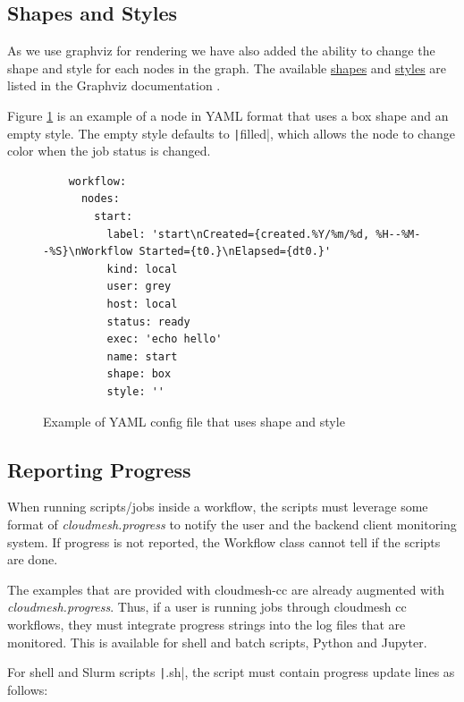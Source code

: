 \subsection{Shapes and Styles}

As we use graphviz for rendering we have also added the ability to
change the shape and style for each nodes in the graph. The
available \href{https://graphviz.org/doc/info/shapes.html}{shapes}
and \href{https://graphviz.org/docs/attr-types/style/}{styles} are
listed in the Graphviz documentation \cite{www-graphviz}.

Figure \ref{fig:shape-style-yaml} is an example of a node in YAML
format that uses a box shape and an empty style. The empty style
defaults to \texttt|filled|, which allows the node to change
color when the job status is changed.

\begin{figure}
    \begin{verbatim}
    workflow:
      nodes:
        start:
          label: 'start\nCreated={created.%Y/%m/%d, %H--%M--%S}\nWorkflow Started={t0.}\nElapsed={dt0.}'
          kind: local
          user: grey
          host: local
          status: ready
          exec: 'echo hello'
          name: start
          shape: box
          style: ''
    \end{verbatim}
    \caption{Example of YAML config file that uses shape and style}
    \label{fig:shape-style-yaml}
\end{figure}



\subsection{Reporting Progress}\label{reporting-progress}

When running scripts/jobs inside a workflow, the scripts must leverage
some format of {\em cloudmesh.progress} to notify the user and the
backend client monitoring system. If progress is not reported, the
Workflow class cannot tell if the scripts are done.

The examples that are provided with cloudmesh-cc are already augmented
with {\em cloudmesh.progress}. Thus, if a user is running jobs through
cloudmesh cc workflows, they must integrate progress strings into the
log files that are monitored. This is available for shell and batch
scripts, Python and Jupyter.

For shell and Slurm scripts \texttt|.sh|, the script must
contain progress update lines as follows:

